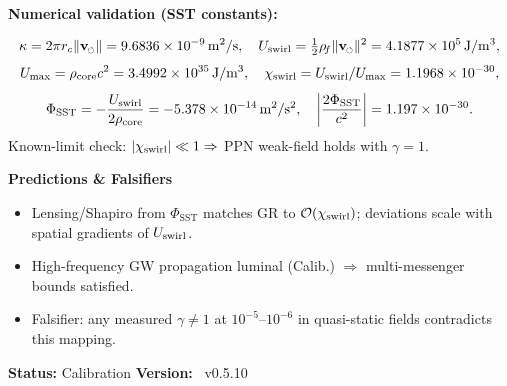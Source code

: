 \documentclass[11pt]{article}
\newcommand{\swirlarrow}{%
	\mathchoice{\mkern-2mu\scriptstyle\boldsymbol{\circlearrowleft}}%
	{\mkern-2mu\scriptstyle\boldsymbol{\circlearrowleft}}%
	{\mkern-2mu\scriptscriptstyle\boldsymbol{\circlearrowleft}}%
	{\mkern-2mu\scriptscriptstyle\boldsymbol{\circlearrowleft}}%
}
\newcommand{\vswirl}{\mathbf{v}_{\swirlarrow}}
\newcommand{\rhoF}{\rho_{\!f}}                           %
\providecommand{\cLight}{c}
\providecommand{\rc}{r_c} %
\begin{document}
\begin{tcolorbox}[title=Rosetta Card: GR/PPN/GW $\to$ Swirl–String Theory (SST)]
        \begin{center}
            \textbf{Numerical validation (SST constants):}\\
        \end{center}
        \[
            \Circulation = 2\pi\rc\lVert\vswirl\rVert
            = \SI{9.6836e-9}{m^2/s},
            \quad
            \Uloc=\tfrac{1}{2}\rhoF \lVert \vswirl\rVert^2=\SI{4.1877e5}{J/m^3},
        \]
        \[
            \Umax = \rho_{\text{core}}\cLight^2 = \SI{3.4992e35}{J/m^3},
            \quad
            \chiS = \Uloc/\Umax = \SI{1.1968e-30}{},
        \]
        \[
            \Phi_{\text{SST}} = -\frac{\Uloc}{2\rho_{\text{core}}}
            = \SI{-5.378e-14}{m^2/s^2},
            \quad
            \left|\frac{2\Phi_{\text{SST}}}{\cLight^2}\right|=\SI{1.197e-30}{}.
        \]
        Known-limit check: $|\chi_{\text{swirl}}|\ll 1 \Rightarrow$ PPN weak-field holds with $\gamma=1$.

        \begin{center}
            \textbf{Predictions \& Falsifiers}\\
        \end{center}
        \begin{itemize}\itemsep2pt
        \item Lensing/Shapiro from $\Phi_{\text{SST}}$ matches GR to $\mathcal{O}(\chi_{\text{swirl}})$; deviations scale with spatial gradients of $U_{\text{swirl}}$.
        \item High-frequency GW propagation luminal (Calib.) $\Rightarrow$ multi-messenger bounds satisfied.
        \item Falsifier: any measured $\gamma\neq 1$ at $10^{-5}$–$10^{-6}$ in quasi-static fields contradicts this mapping.
        \end{itemize}

        \textbf{Status:} Calibration \hfill \textbf{Version:} ~v0.5.10
    \end{tcolorbox}
\end{document}
